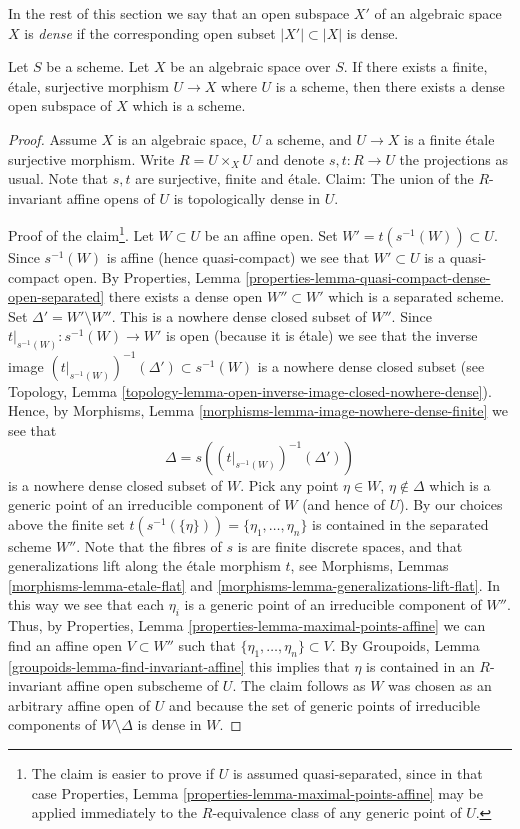 \noindent
In the rest of this section we say that an open subspace
$X'$ of an algebraic space $X$ is {\it dense} if the corresponding
open subset $|X'| \subset |X|$ is dense.

\begin{lemma}
\label{lemma-finite-etale-cover-dense-open-scheme}
Let $S$ be a scheme. Let $X$ be an algebraic space over $S$.
If there exists a finite, \'etale, surjective morphism
$U \to X$ where $U$ is a scheme, then there exists a dense open subspace
of $X$ which is a scheme.
\end{lemma}

\begin{proof}
Assume $X$ is an algebraic space, $U$ a scheme, and $U \to X$ is a finite
\'etale surjective morphism. Write $R = U \times_X U$ and denote
$s, t : R \to U$ the projections as usual. Note that $s, t$ are surjective,
finite and \'etale. Claim: The union of the $R$-invariant affine opens of
$U$ is topologically dense in $U$.

\medskip\noindent
Proof of the claim\footnote{The claim is easier to prove if
$U$ is assumed quasi-separated, since in that case
Properties, Lemma \ref{properties-lemma-maximal-points-affine}
may be applied immediately to the $R$-equivalence class of any
generic point of $U$.}. Let $W \subset U$ be an affine open.
Set $W' = t(s^{-1}(W)) \subset U$. Since $s^{-1}(W)$ is affine
(hence quasi-compact) we see that $W' \subset U$ is a quasi-compact open. By
Properties, Lemma \ref{properties-lemma-quasi-compact-dense-open-separated}
there exists a dense open $W'' \subset W'$ which is a separated scheme.
Set $\Delta' = W' \setminus W''$. This is a nowhere dense closed subset of
$W''$. Since $t|_{s^{-1}(W)} : s^{-1}(W) \to W'$ is open (because it is \'etale)
we see that the inverse image
$(t|_{s^{-1}(W)})^{-1}(\Delta') \subset s^{-1}(W)$
is a nowhere dense closed subset (see
Topology, Lemma \ref{topology-lemma-open-inverse-image-closed-nowhere-dense}).
Hence, by
Morphisms, Lemma \ref{morphisms-lemma-image-nowhere-dense-finite}
we see that
$$
\Delta = s\left((t|_{s^{-1}(W)})^{-1}(\Delta')\right)
$$
is a nowhere dense closed subset of $W$. Pick any point $\eta \in W$,
$\eta \not \in \Delta$ which is a generic point of an irreducible
component of $W$ (and hence of $U$). By our choices above the finite set
$t(s^{-1}(\{\eta\})) = \{\eta_1, \ldots, \eta_n\}$
is contained in the separated scheme $W''$.
Note that the fibres of $s$ is are finite discrete spaces, and that
generalizations lift along the \'etale morphism $t$, see
Morphisms, Lemmas \ref{morphisms-lemma-etale-flat}
and \ref{morphisms-lemma-generalizations-lift-flat}.
In this way we see that each $\eta_i$ is a generic point of an
irreducible component of $W''$. Thus, by
Properties, Lemma \ref{properties-lemma-maximal-points-affine}
we can find an affine open $V \subset W''$ such that
$\{\eta_1, \ldots, \eta_n\} \subset V$.
By
Groupoids, Lemma \ref{groupoids-lemma-find-invariant-affine}
this implies that $\eta$ is contained in an $R$-invariant affine
open subscheme of $U$. The claim follows as $W$ was chosen as an
arbitrary affine open of $U$ and because the set of generic points
of irreducible components of $W \setminus \Delta$ is dense in $W$.


\end{proof}
